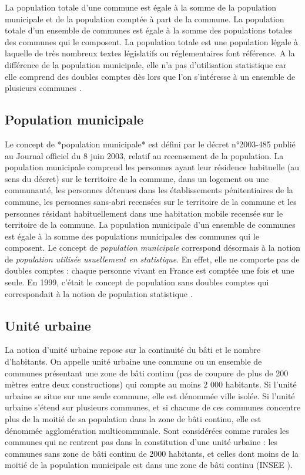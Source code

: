 \documentclass[12pt,english,french,twoside]{report}\usepackage[]{graphicx}\usepackage[]{color}
\begin{document}
La population totale d'une commune est égale à la somme de la population municipale et de la population comptée à part de la commune.
La population totale d'un ensemble de communes est égale à la somme des populations totales des communes qui le composent.
La population totale est une population légale à laquelle de très nombreux textes législatifs ou réglementaires font référence. A la différence de la population municipale, elle n'a pas d'utilisation statistique car elle comprend des doubles comptes dès lors que l'on s'intéresse à un ensemble de plusieurs communes \cite{7}.

\subsection*{Population municipale}
Le concept de *population municipale* est défini par le décret n°2003-485 publié au Journal officiel du 8 juin 2003, relatif au recensement de la population.
La population municipale comprend les personnes ayant leur résidence habituelle (au sens du décret) sur le territoire de la commune, dans un logement ou une communauté, les personnes détenues dans les établissements pénitentiaires de la commune, les personnes sans-abri recensées sur le territoire de la commune et les personnes résidant habituellement dans une habitation mobile recensée sur le territoire de la commune.
La population municipale d'un ensemble de communes est égale à la somme des populations municipales des communes qui le composent.
Le concept de \emph{population municipale} correspond désormais à la notion de \emph{population utilisée usuellement en statistique}. En effet, elle ne comporte pas de doubles comptes : chaque personne vivant en France est comptée une fois et une seule. En 1999, c'était le concept de population sans doubles comptes qui correspondait à la notion de population statistique \cite{6}.


\subsection*{Unité urbaine}
La notion d'unité urbaine repose sur la continuité du bâti et le nombre d'habitants. On appelle unité urbaine une commune ou un ensemble de communes présentant une zone de bâti continu (pas de coupure de plus de 200 mètres entre deux constructions) qui compte au moins 2 000 habitants.
Si l'unité urbaine se situe sur une seule commune, elle est dénommée ville isolée. Si l'unité urbaine s'étend sur plusieurs communes, et si chacune de ces communes concentre plus de la moitié de sa population dans la zone de bâti continu, elle est dénommée agglomération multicommunale.
Sont considérées comme rurales les communes qui ne rentrent pas dans la constitution d'une unité urbaine : les communes sans zone de bâti continu de 2000 habitants, et celles dont moins de la moitié de la population municipale est dans une zone de bâti continu (INSEE \cite{4}).
\end{document}
